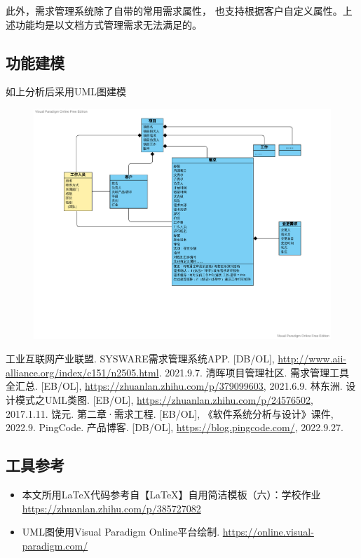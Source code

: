 \documentclass[12pt, a4paper, oneside]{ctexart}
\begin{document}
此外，需求管理系统除了自带的常用需求属性，
也支持根据客户自定义属性。上述功能均是以文档方式管理需求无法满足的。

\subsection{功能建模}
如上分析后采用UML图建模

\begin{figure}[H]
    \centering
    \includegraphics[width = 1\textwidth]{../pic/Untitled.pdf}
\end{figure}


\newpage
{}
\thispagestyle{plain}
\begin{thebibliography}{99}
    工业互联网产业联盟. SYSWARE需求管理系统APP. [DB/OL], \url{http://www.aii-alliance.org/index/c151/n2505.html}. 
        2021.9.7. 
    清晖项目管理社区. 需求管理工具全汇总. [EB/OL], \url{https://zhuanlan.zhihu.com/p/379099603}, 2021.6.9. 
    林东洲. 设计模式之UML类图. [EB/OL], \url{https://zhuanlan.zhihu.com/p/24576502}, 2017.1.11. 
    饶元. 第二章·需求工程. [EB/OL], 《软件系统分析与设计》课件, 2022.9. 
    PingCode. 产品博客. [DB/OL], \url{https://blog.pingcode.com/}, 2022.9.27. 
\end{thebibliography}


\newpage
\begin{appendices}
    \renewcommand{\thesection}{\Alph{section}}
    \section{工具参考}
    \begin{itemize}
        \item 本文所用\LaTeX 代码参考自【LaTeX】自用简洁模板（六）：学校作业 \url{https://zhuanlan.zhihu.com/p/385727082}
        \item UML图使用Visual Paradigm Online平台绘制. \url{https://online.visual-paradigm.com/}
    \end{itemize}
\end{appendices}
\end{document}
